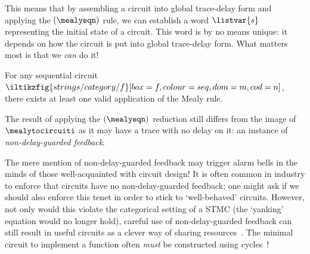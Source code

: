 This means that by assembling a circuit into global trace-delay form and
applying the \((\mealyeqn)\) rule, we can establish a word \(\listvar{s}\)
representing the initial state of a circuit.
This word is by no means unique: it depends on how the circuit is put into
global trace-delay form.
What matters most is that we \emph{can} do it!

\begin{corollary}
    For any sequential circuit \(
        \iltikzfig{strings/category/f}[box=f, colour=seq, dom=m, cod=n]
    \), there exists at least one valid application of the Mealy rule.
\end{corollary}

The result of applying the \((\mealyeqn)\) reduction still differs from the
image of \(\mealytocircuiti\) as it may have a trace with no delay on it: an
instance of \emph{non-delay-guarded feedback}.

\begin{remark}
    The mere mention of non-delay-guarded feedback may trigger alarm bells in
    the minds of those well-acquainted with circuit design!
    It is often common in industry to enforce that circuits have no
    non-delay-guarded feedback; one might ask if we should also enforce this
    tenet in order to stick to `well-behaved' circuits.
    However, not only would this violate the categorical setting of a STMC (the
    `yanking' equation would no longer hold), careful use of non-delay-guarded
    feedback can still result in useful circuits as a clever way of sharing
    resources~\cite{malik1994analysis,riedel2004cyclic,mendler2012constructive}.
    The minimal circuit to implement a function often \emph{must} be
    constructed using cycles~\cite{rivest1977necessity,riedel2003synthesis}!
\end{remark}

